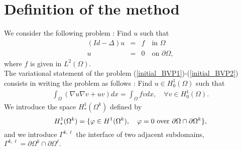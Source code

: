 \documentclass[final]{siamltex}
\begin{document}
\section{Definition of the method}\label{sec.defmethod}
We consider the following problem : Find $u$ such that
\begin{eqnarray}
\label{initial_BVP1}
(Id - \Delta)u &=& f \quad \mbox{in } \Omega \\
\label{initial_BVP2}
              u &=& 0 \quad \mbox{on } \partial{\Omega},
\end{eqnarray}
where $f$ is given in $L^2(\Omega)$. \\
The variational statement of the problem
(\ref{initial_BVP1})-(\ref{initial_BVP2})
consists in writing the problem as follows : Find $u \in H^1_0(\Omega)$
such that
\begin{eqnarray}\label{initial_VF}
\int_{\Omega} \left(\nabla u \nabla v +uv \right) dx = \int_{\Omega} fvdx,
\quad \forall v \in H^1_0(\Omega).
\end{eqnarray}
We introduce the space $H^1_*(\Omega^k)$ defined by
$$H^1_*(\Omega^k) = \{\varphi\in H^1(\Omega^k),\quad
\varphi = 0 \hbox{ over } \partial\Omega\cap\partial
\Omega^k\},$$
and we introduce $\Gamma^{k,\ell}$ the interface of two adjacent
subdomains, $\Gamma^{k,\ell} =
\partial\Omega^k\cap\partial\Omega^\ell.$
\end{document}
